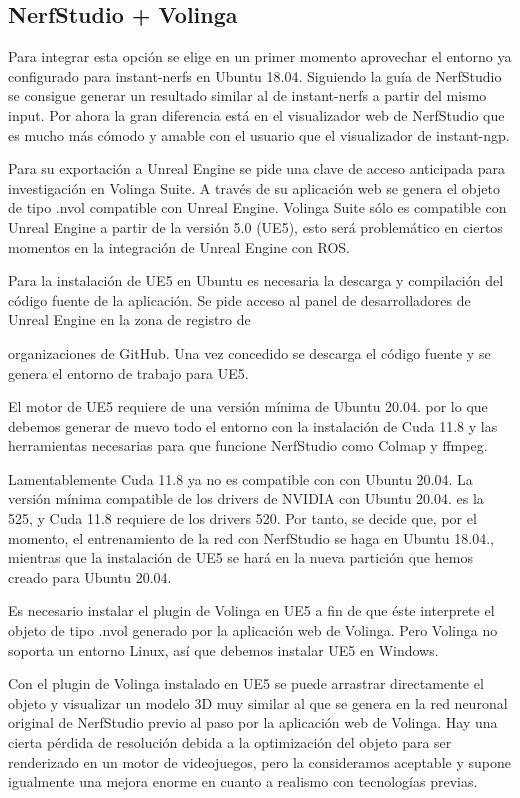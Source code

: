 \documentclass[a4paper, 12pt, spanish, twoside]{article}
\begin{document}
\subsection{NerfStudio + Volinga}

Para integrar esta opción se elige en un primer momento aprovechar el entorno ya configurado para instant-nerfs en Ubuntu 18.04. Siguiendo la guía de NerfStudio se consigue generar un resultado similar al de instant-nerfs a partir del mismo input. Por ahora la gran diferencia está en el visualizador web de NerfStudio que es mucho más cómodo y amable con el usuario que el visualizador de instant-ngp.

Para su exportación a Unreal Engine se pide una clave de acceso anticipada para investigación en Volinga Suite. A través de su aplicación web se genera el objeto de tipo .nvol compatible con Unreal Engine. Volinga Suite sólo es compatible con Unreal Engine a partir de la versión 5.0 (UE5), esto será problemático en ciertos momentos en la integración de Unreal Engine con ROS.

Para la instalación de UE5 en Ubuntu es necesaria la descarga y compilación del código fuente de la aplicación. Se pide acceso al panel de desarrolladores de Unreal Engine en la zona de registro de

organizaciones de GitHub. Una vez concedido se descarga el código fuente y se genera el entorno de trabajo para UE5.

El motor de UE5 requiere de una versión mínima de Ubuntu 20.04. por lo que debemos generar de nuevo todo el entorno con la instalación de Cuda 11.8 y las herramientas necesarias para que funcione NerfStudio como Colmap y ffmpeg.

Lamentablemente Cuda 11.8 ya no es compatible con con Ubuntu 20.04. La versión mínima compatible de los drivers de NVIDIA con Ubuntu 20.04. es la 525, y Cuda 11.8 requiere de los drivers 520. Por tanto, se decide que, por el momento, el entrenamiento de la red con NerfStudio se haga en Ubuntu 18.04., mientras que la instalación de UE5 se hará en la nueva partición que hemos creado para Ubuntu 20.04.

Es necesario instalar el plugin de Volinga en UE5 a fin de que éste interprete el objeto de tipo .nvol generado por la aplicación web de Volinga. Pero Volinga no soporta un entorno Linux, así que debemos instalar UE5 en Windows.

Con el plugin de Volinga instalado en UE5 se puede arrastrar directamente el objeto y visualizar un modelo 3D muy similar al que se genera en la red neuronal original de NerfStudio previo al paso por la aplicación web de Volinga. Hay una cierta pérdida de resolución debida a la optimización del objeto para ser renderizado en un motor de videojuegos, pero la consideramos aceptable y supone igualmente una mejora enorme en cuanto a realismo con tecnologías previas.
\end{document}

